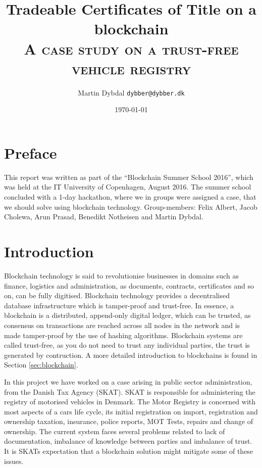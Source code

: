 \documentclass[oneside,a4paper,10pts,article]{memoir}
\title{Tradeable Certificates of Title on a blockchain \\
 {\normalfont\normalsize\scshape A case study on a trust-free vehicle registry}
}
\author{Martin Dybdal \texttt{dybber@dybber.dk}}
\date{\today}
\begin{document}
\maketitle

\begin{abstract}
  
\end{abstract}

\chapter{Preface}
This report was written as part of the ``Blockchain Summer School
2016'', which was held at the IT University of Copenhagen, August
2016. The summer school concluded with a 1-day hackathon, where we in
groups were assigned a case, that we should solve using blockchain
technology. Group-members: Felix Albert, Jacob Cholewa, Arun Prasad,
Benedikt Notheisen and Martin Dybdal.

\chapter{Introduction}
Blockchain technology is said to revolutionise businesses in domains
such as finance, logistics and administration, as documents,
contracts, certificates and so on, can be fully digitised. Blockchain
technology provides a decentralised database infrastructure which is
tamper-proof and trust-free. In essence, a blockchain is a
distributed, append-only digital ledger, which can be trusted, as
consensus on transactions are reached across all nodes in the network
and is made tamper-proof by the use of hashing algorithms. Blockchain
systems are called trust-free, as you do not need to trust any
individual parties, the trust is generated by contruction. A more
detailed introduction to blockchains is found in Section
\ref{sec:blockchain}.

In this project we have worked on a case arising in
public sector administration, from the Danish Tax Agency (SKAT). SKAT
is responsible for administering the registry of motorised vehicles in
Denmark. The Motor Registry is concerned with most aspects of a cars
life cycle, its initial registration on import, registration and
ownership taxation, insurance, police reports, MOT Tests, repairs and
change of ownership. The current system faces several problems related
to lack of documentation, imbalance of knowledge between parties and
imbalance of trust. It is SKATs expectation that a blockchain solution
might mitigate some of these issues.
\end{document}
